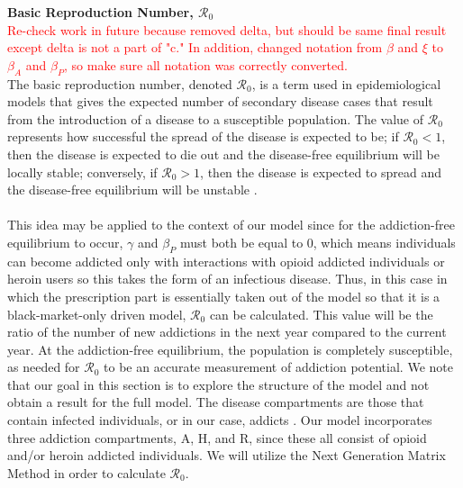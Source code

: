 \documentclass[12pt]{article}
\begin{document}




\textbf{Basic Reproduction Number, \textbf{$\mathscr{R}_0$}} \\
\textcolor{red}{Re-check work in future because removed delta, but should be same final result except 
delta is not a part of "c." In addition, changed notation from $\beta$ and $\xi$ to $\beta_{A}$ and $\beta_{P}$, so make sure all notation was correctly converted.} \\

The basic reproduction number, denoted $\mathscr{R}_0$, is a term used in epidemiological models that gives the expected number of secondary disease cases that result from the introduction of a disease to a susceptible population. The value of $\mathscr{R}_0$ represents how successful the spread of the disease is expected to be; if $\mathscr{R}_0 < 1$, then the disease is expected to die out and the disease-free equilibrium will be locally stable; conversely, if $\mathscr{R}_0 >1$, then the disease is expected to spread and the disease-free equilibrium will be unstable \cite{Driessche}. \\ \\
 This idea may be applied to the context of our model since for the addiction-free equilibrium to occur, $\gamma$ and $\beta_{P}$ must both be equal to 0, which means individuals can become addicted only with interactions with opioid addicted individuals or heroin users so this takes the form of an infectious disease. Thus, in this case in which the prescription part is essentially taken out of the model so that it is a black-market-only driven model, $\mathscr{R}_0$ can be calculated. This value will be the ratio of the number of new addictions in the next year compared to the current year. At the addiction-free equilibrium, the population is completely susceptible, as needed for $\mathscr{R}_0$ to be an accurate measurement of addiction potential. 
We note that our goal in this section is to explore the structure of the model and not obtain a result for the full model. The disease compartments are those that contain infected individuals, or in our case, addicts \cite{Driessche}. Our model incorporates three addiction compartments, A, H, and R, since these all consist of opioid and/or heroin addicted individuals. We will utilize the Next Generation Matrix Method in order to calculate $\mathscr{R}_0$.
\end{document}
